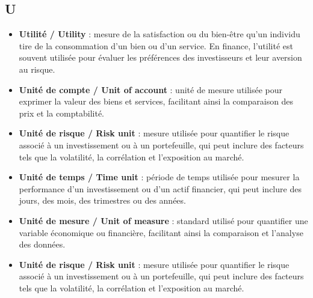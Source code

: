 \documentclass[a4paper,10pt]{article}
\begin{document}
\begin{multicols}{2}
\section*{U}
\begin{itemize}
  \item \textbf{Utilité / Utility} : mesure de la satisfaction ou du bien-être qu’un individu tire de la consommation d’un bien ou d’un service. En finance, l’utilité est souvent utilisée pour évaluer les préférences des investisseurs et leur aversion au risque.
  \item \textbf{Unité de compte / Unit of account} : unité de mesure utilisée pour exprimer la valeur des biens et services, facilitant ainsi la comparaison des prix et la comptabilité.
  \item \textbf{Unité de risque / Risk unit} : mesure utilisée pour quantifier le risque associé à un investissement ou à un portefeuille, qui peut inclure des facteurs tels que la volatilité, la corrélation et l’exposition au marché.
  \item \textbf{Unité de temps / Time unit} : période de temps utilisée pour mesurer la performance d’un investissement ou d’un actif financier, qui peut inclure des jours, des mois, des trimestres ou des années.
  \item \textbf{Unité de mesure / Unit of measure} : standard utilisé pour quantifier une variable économique ou financière, facilitant ainsi la comparaison et l’analyse des données.
  \item \textbf{Unité de risque / Risk unit} : mesure utilisée pour quantifier le risque associé à un investissement ou à un portefeuille, qui peut inclure des facteurs tels que la volatilité, la corrélation et l’exposition au marché.
\end{itemize}


\end{multicols}
\end{document}
